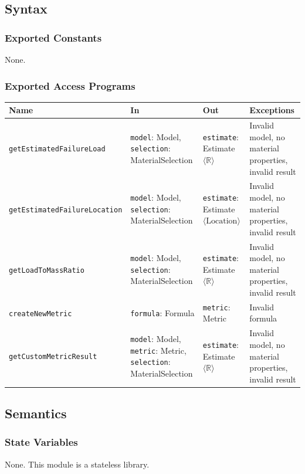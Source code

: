 \documentclass[12pt, titlepage]{article}
\begin{document}
\subsection{Syntax}

\subsubsection{Exported Constants}
None.

\subsubsection{Exported Access Programs}
\begin{tabularx}{\textwidth}{p{5.5cm} p{4.0cm} p{3.2cm} X}
\toprule
\textbf{Name} & \textbf{In} & \textbf{Out} & \textbf{Exceptions} \\
\midrule
\texttt{getEstimatedFailureLoad} & \texttt{model}: Model, \texttt{selection}: MaterialSelection & \texttt{estimate}: Estimate$\langle \mathbb{R} \rangle$ & Invalid model, no material properties, invalid result \\
\texttt{getEstimatedFailureLocation} & \texttt{model}: Model, \texttt{selection}: MaterialSelection & \texttt{estimate}: Estimate$\langle \text{Location} \rangle$ & Invalid model, no material properties, invalid result \\
\texttt{getLoadToMassRatio} & \texttt{model}: Model, \texttt{selection}: MaterialSelection & \texttt{estimate}: Estimate$\langle \mathbb{R} \rangle$ & Invalid model, no material properties, invalid result \\
\texttt{createNewMetric} & \texttt{formula}: Formula & \texttt{metric}: Metric & Invalid formula \\
\texttt{getCustomMetricResult} & \texttt{model}: Model, \texttt{metric}: Metric, \texttt{selection}: MaterialSelection & \texttt{estimate}: Estimate$\langle \mathbb{R} \rangle$ & Invalid model, no material properties, invalid result \\
\bottomrule
\end{tabularx}

\subsection{Semantics}

\subsubsection{State Variables}
None. This module is a stateless library.
\end{document}
